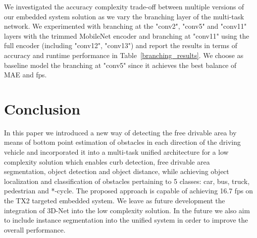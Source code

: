 \documentclass[10pt,twocolumn,letterpaper]{article}
\begin{document}
We investigated the accuracy \vs complexity trade-off between multiple versions of our embedded system solution as we vary the branching layer of the multi-task network. We experimented with branching at the "conv2", "conv5" and "conv11" layers with the trimmed MobileNet encoder and branching at "conv11" using the full encoder (including "conv12", "conv13") and report the results in terms of accuracy and runtime performance in Table~\ref{branching_results}. We choose as baseline model the branching at "conv5" since it achieves the best balance of MAE and fps.



\section{Conclusion}
In this paper we introduced a new way of detecting the free drivable area by means of bottom point estimation of obstacles in each direction of the driving vehicle and incorporated it into a multi-task unified architecture for a low complexity solution which enables curb detection, free drivable area segmentation, object detection and object distance, while achieving object localization and classification of obstacles pertaining to 5 classes: car, bus, truck, pedestrian and *-cycle. The proposed approach is capable of achieving 16.7 fps on the TX2 targeted embedded system.
We leave as future development the integration of 3D-Net into the low complexity solution. In the future we also aim to include instance segmentation into the unified system in order to improve the overall performance.



{\small


}
\end{document}
